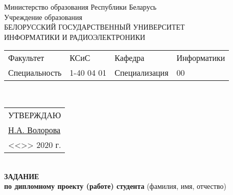 {
  \thispagestyle{empty}
  \setlength{\parindent}{0em}

  \newcommand{\lineunderscore}{\uline{\hspace*{\fill}}}

  \begin{center}
    Министерство образования Республики Беларусь\\
    Учреждение образования\\
    БЕЛОРУССКИЙ ГОСУДАРСТВЕННЫЙ УНИВЕРСИТЕТ \\
    ИНФОРМАТИКИ И РАДИОЭЛЕКТРОНИКИ\\[1em]


  \begin{minipage}{\textwidth}
    \begin{flushleft}
      \begin{tabular}{ p{}p{}p{}p{} @{} }
        Факультет & КСиС & Кафедра & Информатики \\
        Специальность   & 1-40 04 01 & Специализация & 00
      \end{tabular}
    \end{flushleft}
  \end{minipage}\\[1em]

  \begin{minipage}{\textwidth}
    \begin{flushright}
      \begin{tabular}{p{}}
        УТВЕРЖДАЮ \\[0.5em]
        \underline{ Н.А. Волорова \hspace*{15ex}} \\
        <<\underline{\hspace*{4ex}}>> \underline{\hspace*{7em}} 2020 г.
      \end{tabular}
    \end{flushright}
  \end{minipage}\\[1em]
  \textbf{ЗАДАНИЕ} \\
  \textbf{по дипломному проекту (работе) студента}
  {\small (фамилия, имя, отчество) }


\end{center}}
